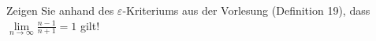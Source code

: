 \item Zeigen Sie anhand des $\varepsilon$-Kriteriums aus der Vorlesung (Definition 19), dass $\lim\limits_{n\to\infty} \frac{n-1}{n+1} = 1$ gilt!
